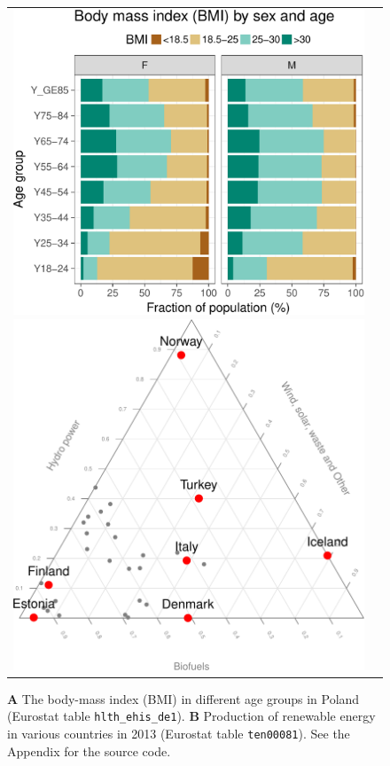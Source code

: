 \begin{figure}
\begin{center}
\begin{tabular}{cc}
  \includegraphics{2017-manu-bmi-1}
  \includegraphics{2017-manu-energy-1}
\end{tabular}
\end{center}
\caption{{\bf A} The body-mass index (BMI) in different age groups in Poland (Eurostat table \texttt{hlth\_ehis\_de1}). {\bf B} Production of renewable energy in various countries in 2013 (Eurostat table \texttt{ten00081}). See the Appendix for the source code.}
\label{fig:bmi}
\end{figure}



